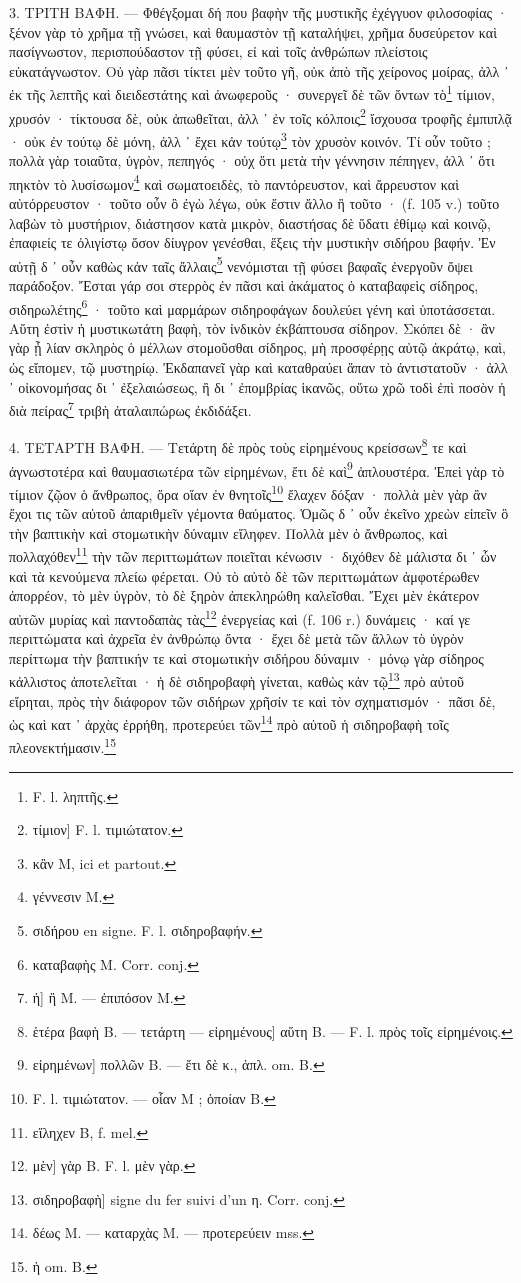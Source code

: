 \documentclass[a4paper, 11pt, oneside, polutonikogreek, french]{article}
\begin{document}
3. ΤΡΙΤΗ ΒΑΦΗ. --- Φθέγξομαι δή που βαφὴν τῆς μυστικῆς ἐχέγγυον φιλοσοφίας · ξένον γὰρ τὸ χρῆμα τῇ γνώσει, καὶ θαυμαστὸν τῇ καταλήψει, χρῆμα δυσεύρετον καὶ πασίγνωστον, περισπούδαστον τῇ φύσει, εἰ καὶ τοῖς ἀνθρώπων πλείστοις εὐκατάγνωστον. Οὐ γὰρ πᾶσι τίκτει μὲν τοῦτο γῆ, οὐκ ἀπὸ τῆς χείρονος μοίρας, ἀλλ ᾽ ἐκ τῆς λεπτῆς καὶ διειδεστάτης καὶ ἀνωφεροῦς · συνεργεῖ δὲ τῶν ὄντων τὸ\footnote{F. l. ληπτῆς.} τίμιον, χρυσόν · τίκτουσα δὲ, οὐκ ἀπωθεῖται, ἀλλ ᾽ ἐν τοῖς κόλποις\footnote{τίμιον] F. l. τιμιώτατον.} ἴσχουσα τροφῆς ἐμπιπλᾷ · οὐκ ἐν τούτῳ δὲ μόνη, ἀλλ ᾽ ἔχει κἀν τούτῳ\footnote{κἂν M, ici et partout.} τὸν χρυσὸν κοινόν. Τί οὖν τοῦτο ; πολλὰ γὰρ τοιαῦτα, ὑγρὸν, πεπηγός · οὐχ ὅτι μετὰ τὴν γέννησιν πέπηγεν, ἀλλ ᾽ ὅτι πηκτὸν τὸ λυσίσωμον\footnote{γέννεσιν M.} καὶ σωματοειδὲς, τὸ παντόρευστον, καὶ ἄρρευστον καὶ αὐτόρρευστον · τοῦτο οὖν ὃ ἐγὼ λέγω, οὐκ ἔστιν ἄλλο ἢ τοῦτο · (f. 105 v.) τοῦτο λαβὼν τὸ μυστήριον, διάστησον κατὰ μικρὸν, διαστήσας δὲ ὕδατι ἐθίμῳ καὶ κοινῷ, ἐπαφιείς τε ὀλιγίστῳ ὅσον δίυγρον γενέσθαι, ἕξεις τὴν μυστικὴν σιδήρου βαφήν. Ἐν αὐτῇ δ ᾽ οὖν καθὼς κἀν ταῖς ἄλλαις\footnote{σιδήρου en signe. F. l. σιδηροβαφήν.} νενόμισται τῇ φύσει βαφαῖς ἐνεργοῦν ὄψει παράδοξον. Ἔσται γάρ σοι στερρὸς ἐν πᾶσι καὶ ἀκάματος ὁ καταβαφεὶς σίδηρος, σιδηρωλέτης\footnote{καταβαφὴς M. Corr. conj.} · τοῦτο καὶ μαρμάρων σιδηροφάγων δουλεύει γένη καὶ ὑποτάσσεται. Αὕτη ἐστὶν ἡ μυστικωτάτη βαφὴ, τὸν ἰνδικὸν ἐκβάπτουσα σίδηρον. Σκόπει δὲ · ἂν γὰρ ᾖ λίαν σκληρὸς ὁ μέλλων στομοῦσθαι σίδηρος, μὴ προσφέρῃς αὐτῷ ἀκράτῳ, καὶ, ὡς εἴπομεν, τῷ μυστηρίῳ. Ἐκδαπανεῖ γὰρ καὶ καταθραύει ἅπαν τὸ ἀντιστατοῦν · ἀλλ ᾽ οἰκονομήσας δι ᾽ ἐξελαιώσεως, ἢ δι ᾽ ἐπομβρίας ἱκανῶς, οὕτω χρῶ τοδὶ ἐπὶ ποσὸν ἡ διὰ πείρας\footnote{ἡ] ἢ M. --- ἐπιπόσον M.} τριβὴ ἀταλαιπώρως ἐκδιδάξει.

4. ΤΕΤΑΡΤΗ ΒΑΦΗ. --- Τετάρτη δὲ πρὸς τοὺς εἰρημένους κρείσσων\footnote{ἑτέρα βαφὴ B. --- τετάρτη --- εἰρημένους] αὕτη B. --- F. l. πρὸς τοῖς εἰρημένοις.} τε καὶ ἀγνωστοτέρα καὶ θαυμασιωτέρα τῶν εἰρημένων, ἔτι δὲ καὶ\footnote{εἰρημένων] πολλῶν B. --- ἔτι δὲ κ., ἁπλ. om. B.} ἁπλουστέρα. Ἐπεὶ γὰρ τὸ τίμιον ζῷον ὁ ἄνθρωπος, ὅρα οἵαν ἐν θνητοῖς\footnote{F. l. τιμιώτατον. --- οἷαν M ; ὁποίαν B.} ἔλαχεν δόξαν · πολλὰ μὲν γὰρ ἂν ἔχοι τις τῶν αὐτοῦ ἀπαριθμεῖν γέμοντα θαύματος. Ὁμῶς δ ᾽ οὖν ἐκεῖνο χρεὼν εἰπεῖν ὃ τὴν βαπτικὴν καὶ στομωτικὴν δύναμιν εἴληφεν. Πολλὰ μὲν ὁ ἄνθρωπος, καὶ πολλαχόθεν\footnote{εἴληχεν B, f. mel.} τὴν τῶν περιττωμάτων ποιεῖται κένωσιν · διχόθεν δὲ μάλιστα δι ᾽ ὧν καὶ τὰ κενούμενα πλείω φέρεται. Οὐ τὸ αὐτὸ δὲ τῶν περιττωμάτων ἀμφοτέρωθεν ἀπορρέον, τὸ μὲν ὑγρὸν, τὸ δὲ ξηρὸν ἀπεκληρώθη καλεῖσθαι. Ἔχει μὲν ἑκάτερον αὐτῶν μυρίας καὶ παντοδαπὰς τὰς\footnote{μὲν] γὰρ B. F. l. μὲν γὰρ.} ἐνεργείας καὶ (f. 106 r.) δυνάμεις · καί γε περιττώματα καὶ ἀχρεῖα ἐν ἀνθρώπῳ ὄντα · ἔχει δὲ μετὰ τῶν ἄλλων τὸ ὑγρὸν περίττωμα τὴν βαπτικήν τε καὶ στομωτικὴν σιδήρου δύναμιν · μόνῳ γὰρ σίδηρος κάλλιστος ἀποτελεῖται · ἡ δὲ σιδηροβαφὴ γίνεται, καθὼς κἀν τῷ\footnote{σιδηροβαφὴ] signe du fer suivi d'un η. Corr. conj.} πρὸ αὐτοῦ εἴρηται, πρὸς τὴν διάφορον τῶν σιδήρων χρῆσίν τε καὶ τὸν σχηματισμόν · πᾶσι δὲ, ὡς καὶ κατ ᾽ ἀρχὰς ἐρρήθη, προτερεύει τῶν\footnote{δέως M. --- καταρχὰς M. --- προτερεύειν mss.} πρὸ αὐτοῦ ἡ σιδηροβαφὴ τοῖς πλεονεκτήμασιν.\footnote{ἡ om. B.}
\end{document}
